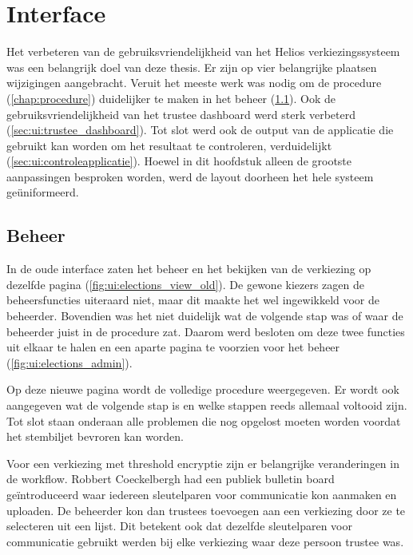 % 
%

\chapter{Interface}
\label{chap:interface}

Het verbeteren van de gebruiksvriendelijkheid van het Helios verkiezingssysteem was een belangrijk doel van deze thesis. Er zijn op vier belangrijke plaatsen wijzigingen aangebracht. Veruit het meeste werk was nodig om de procedure (\ref{chap:procedure}) duidelijker te maken in het beheer (\ref{sec:ui:beheer}). Ook de gebruiksvriendelijkheid van het trustee dashboard werd sterk verbeterd (\ref{sec:ui:trustee_dashboard}). Tot slot werd ook de output van de applicatie die gebruikt kan worden om het resultaat te controleren, verduidelijkt (\ref{sec:ui:controleapplicatie}). Hoewel in dit hoofdstuk alleen de grootste aanpassingen besproken worden, werd de layout doorheen het hele systeem geüniformeerd.

\section{Beheer}
\label{sec:ui:beheer}

In de oude interface zaten het beheer en het bekijken van de verkiezing op dezelfde pagina (\ref{fig:ui:elections_view_old}). De gewone kiezers zagen de beheersfuncties uiteraard niet, maar dit maakte het wel ingewikkeld voor de beheerder. Bovendien was het niet duidelijk wat de volgende stap was of waar de beheerder juist in de procedure zat. Daarom werd besloten om deze twee functies uit elkaar te halen en een aparte pagina te voorzien voor het beheer (\ref{fig:ui:elections_admin}).

\npar Op deze nieuwe pagina wordt de volledige procedure weergegeven. Er wordt ook aangegeven wat de volgende stap is en welke stappen reeds allemaal voltooid zijn. Tot slot staan onderaan alle problemen die nog opgelost moeten worden voordat het stembiljet bevroren kan worden.


\npar Voor een verkiezing met threshold encryptie zijn er belangrijke veranderingen in de workflow. Robbert Coeckelbergh had een publiek bulletin board ge\"introduceerd waar iedereen sleutelparen voor communicatie kon aanmaken en uploaden. De beheerder kon dan trustees toevoegen aan een verkiezing door ze te selecteren uit een lijst. Dit betekent ook dat dezelfde sleutelparen voor communicatie gebruikt werden bij elke verkiezing waar deze persoon trustee was.

